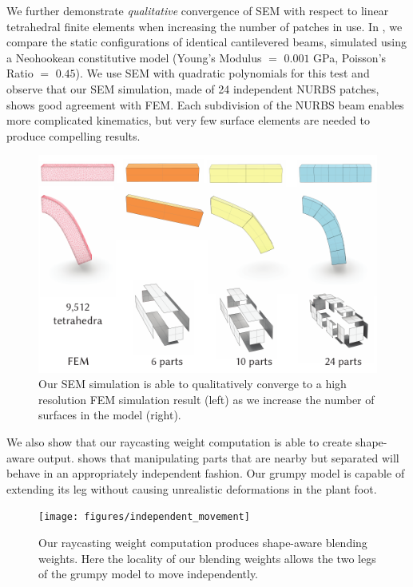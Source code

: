 We further demonstrate \emph{qualitative} convergence of SEM with respect to linear tetrahedral finite elements when increasing the number of patches in use.
In , we compare the static configurations of identical cantilevered beams, simulated using a Neohookean constitutive model (Young's Modulus $=$ $0.001$ GPa, Poisson's Ratio $=$ $0.45$). 
We use SEM with quadratic polynomials for this test and observe that our SEM simulation, made of 24 independent NURBS patches, shows good agreement with FEM. Each subdivision of the NURBS beam enables more complicated kinematics, 
but very few surface elements are needed to produce compelling results.

\begin{figure}[h]
  \includegraphics[width=\columnwidth]{figures/beams.pdf}
  \caption{Our SEM simulation is able to qualitatively converge to a high resolution FEM simulation result (left) as we increase the number of surfaces in the model (right). }
  \label{fig:convergence}
\end{figure}

We also show that our raycasting weight computation is able to create shape-aware output.  shows that manipulating
parts that are nearby but separated will behave in an appropriately independent fashion. Our grumpy model is capable of extending 
its leg without causing unrealistic deformations in the plant foot.

\begin{figure}[h]
  \texttt{[image: figures/independent\_movement]}
  \caption{Our raycasting weight computation produces shape-aware blending weights. Here the locality of our blending weights allows the two legs of the grumpy model to move independently. }
  \label{fig:independence}
\end{figure}

